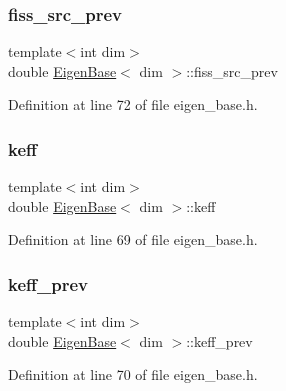 \subsubsection{\texorpdfstring{fiss\+\_\+src\+\_\+prev}{fiss\_src\_prev}}
{\footnotesize\ttfamily template$<$int dim$>$ \\
double \hyperlink{class_eigen_base}{Eigen\+Base}$<$ dim $>$\+::fiss\+\_\+src\+\_\+prev\hspace{0.3cm}{\ttfamily [protected]}}



Definition at line 72 of file eigen\+\_\+base.\+h.

\mbox{\label{class_eigen_base_a9373e0bd7462b70829d88b82cb66ac10}} 
\subsubsection{\texorpdfstring{keff}{keff}}
{\footnotesize\ttfamily template$<$int dim$>$ \\
double \hyperlink{class_eigen_base}{Eigen\+Base}$<$ dim $>$\+::keff\hspace{0.3cm}{\ttfamily [protected]}}



Definition at line 69 of file eigen\+\_\+base.\+h.

\mbox{\label{class_eigen_base_a1499f0cb877e5dff2013328e06a29b4a}} 
\subsubsection{\texorpdfstring{keff\+\_\+prev}{keff\_prev}}
{\footnotesize\ttfamily template$<$int dim$>$ \\
double \hyperlink{class_eigen_base}{Eigen\+Base}$<$ dim $>$\+::keff\+\_\+prev\hspace{0.3cm}{\ttfamily [protected]}}



Definition at line 70 of file eigen\+\_\+base.\+h.

\mbox{\label{class_eigen_base_aec9885df50ea40a18fd5708061139843}} 

